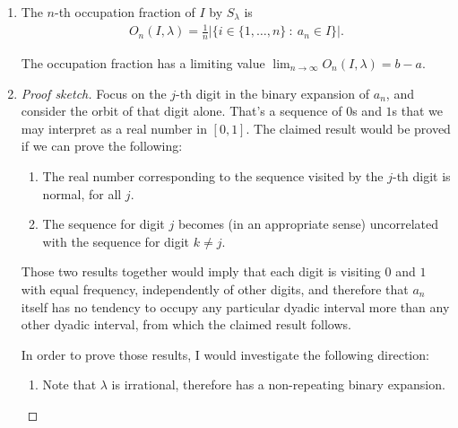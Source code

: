 \begin{enumerate}[label=(5.\arabic*)]
\begin{proof}
    Now suppose $\lambda$ is irrational. Then
    \begin{align*}
      S^k_\lambda(x) = x + k\lambda \mod 1.
    \end{align*}
    Since $k\lambda = i$ has no solutions for irrational $\lambda$ and integers $i, k$, we see that the
    sequence never returns to its starting point.
  \end{proof}


\item
  \begin{definition*}
    The $n$-th occupation fraction of $I$ by $S_\lambda$ is
    \begin{align*}
      O_n(I, \lambda) = \frac{1}{n}\Big|\Big\{i \in \{1, \ldots, n\} ~:~ a_n \in I\Big\}\Big|.
    \end{align*}
  \end{definition*}
  \begin{claim*}
    The occupation fraction has a limiting value $\lim_{n\to\infty}O_n(I, \lambda) = b - a$.
  \end{claim*}
\item

  \begin{proof}[Proof sketch]
    Focus on the $j$-th digit in the binary expansion of $a_n$, and consider the orbit of that digit alone.
    That's a sequence of $0$s and $1$s that we may interpret as a real number in $[0, 1]$. The claimed result
    would be proved if we can prove the following:

    \begin{enumerate}
    \item The real number corresponding to the sequence visited by the $j$-th digit is normal, for all $j$.
    \item The sequence for digit $j$ becomes (in an appropriate sense) uncorrelated with the sequence for
      digit $k \neq j$.
    \end{enumerate}

    Those two results together would imply that each digit is visiting $0$ and $1$ with equal frequency,
    independently of other digits, and therefore that $a_n$ itself has no tendency to occupy any particular
    dyadic interval more than any other dyadic interval, from which the claimed result follows.

    In order to prove those results, I would investigate the following direction:
    \begin{enumerate}
    \item Note that $\lambda$ is irrational, therefore has a non-repeating binary expansion.


\end{enumerate}
\end{proof}
\end{enumerate}
